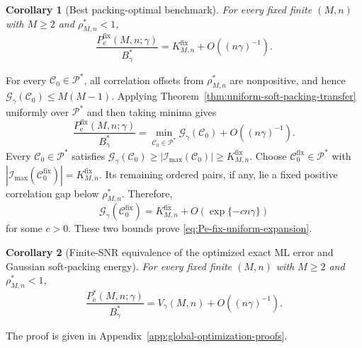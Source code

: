 \documentclass[12pt,draftclsnofoot,onecolumn]{IEEEtran}
\newcommand{\cC}{\mathcal{C}}
\newcommand{\cG}{\mathcal{G}}
\newcommand{\cI}{\mathcal{I}}
\newcommand{\cP}{\mathcal{P}}
\newcommand{\Pe}{P_{\mathrm e}}
\newtheorem{corollary}{Corollary}
\theoremstyle{definition}
\begin{document}
\begin{corollary}[Best packing-optimal benchmark]
\label{cor:packing-optimal-benchmark}
For every fixed finite \((M,n)\) with \(M\ge2\) and
\(\rho^{\ast}_{M,n}<1\),
\begin{equation}
  \frac{\Pe^{\mathrm{fix}}(M,n;\gamma)}{B_\gamma^{\ast}}
  =K^{\mathrm{fix}}_{M,n}+O((n\gamma)^{-1}).
  \label{eq:Pe-fix-uniform-expansion}
\end{equation}
\end{corollary}

\begin{IEEEproof}
For every \(\cC_0\in\cP^{\ast}\), all correlation offsets from
\(\rho^{\ast}_{M,n}\) are nonpositive, and hence
\(\cG_\gamma(\cC_0)\le M(M-1)\).  Applying
Theorem~\ref{thm:uniform-soft-packing-transfer} uniformly over
\(\cP^{\ast}\) and then taking minima gives
\begin{equation*}
  \frac{\Pe^{\mathrm{fix}}(M,n;\gamma)}{B_\gamma^{\ast}}
  =\min_{\cC_0\in\cP^{\ast}}\cG_\gamma(\cC_0)
  +O((n\gamma)^{-1}).
\end{equation*}
Every \(\cC_0\in\cP^{\ast}\) satisfies
\(\cG_\gamma(\cC_0)\ge|\cI_{\max}(\cC_0)|
\ge K^{\mathrm{fix}}_{M,n}\).  Choose
\(\cC_0^{\mathrm{fix}}\in\cP^{\ast}\) with
\(|\cI_{\max}(\cC_0^{\mathrm{fix}})|=K^{\mathrm{fix}}_{M,n}\).
Its remaining ordered pairs, if any, lie a fixed positive correlation
gap below \(\rho^{\ast}_{M,n}\).  Therefore,
\begin{equation*}
  \cG_\gamma(\cC_0^{\mathrm{fix}})
  =K^{\mathrm{fix}}_{M,n}+O(\exp\{-c n\gamma\})
\end{equation*}
for some \(c>0\).  These two bounds prove
\eqref{eq:Pe-fix-uniform-expansion}.
\end{IEEEproof}



\begin{corollary}[Finite-SNR equivalence of the optimized exact ML error and Gaussian soft-packing energy]
\label{cor:optimized-soft-packing-transfer}
For every fixed finite \((M,n)\) with \(M\ge2\) and \(\rho^{\ast}_{M,n}<1\),
\begin{equation}
  \frac{\Pe^{\ast}(M,n;\gamma)}{B_\gamma^{\ast}}
  =V_\gamma(M,n)+O((n\gamma)^{-1}).
  \label{eq:optimized-soft-packing-transfer}
\end{equation}
\end{corollary}

\begin{IEEEproof}
The proof is given in
Appendix~\ref{app:global-optimization-proofs}.
\end{IEEEproof}
\end{document}
